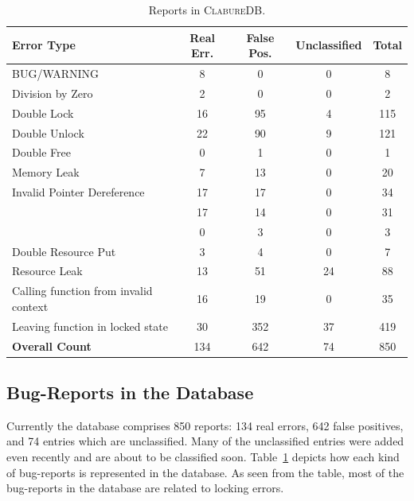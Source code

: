 \documentclass[10pt]{llncs}
\newcommand\cdb{\textsc{ClabureDB}\xspace}
\begin{document}
\begin{table}[tb]
\begin{center}
\small
\setlength{\tabcolsep}{2.5pt}
\begin{tabular}{|l|c|c|c|c|} \hline
\textbf{Error Type} & \textbf{Real Err.} & \textbf{False Pos.} &
	\textbf{Unclassified} & \textbf{Total} \\ \hline
BUG/WARNING & 8 & 0 & 0 & 8 \\
Division by Zero & 2 & 0 & 0 & 2 \\
Double Lock & 16 & 95 & 4 & 115 \\
Double Unlock & 22 & 90 & 9 & 121 \\
Double Free & 0 & 1 & 0 & 1 \\
Memory Leak & 7 & 13 & 0 & 20 \\
Invalid Pointer Dereference & 17 & 17 & 0 & 34 \\ 
\hspace{1em}\cellcolor{black!10}{\scriptsize NULL Pointer Dereference} & 
\cellcolor{black!10}\scriptsize 17 & \cellcolor{black!10}\scriptsize 14 & 
\cellcolor{black!10}\scriptsize 0 & \cellcolor{black!10}\scriptsize 31 \\
\hspace{1em}\cellcolor{black!10}{\scriptsize Use After Free} & 
\cellcolor{black!10}\scriptsize 0 & \cellcolor{black!10}\scriptsize 3 & 
\cellcolor{black!10}\scriptsize 0 & \cellcolor{black!10}\scriptsize 3 \\
Double Resource Put & 3 & 4 & 0 & 7 \\
Resource Leak & 13 & 51 & 24 & 88 \\
Calling function from invalid context & 16 & 19 & 0 & 35 \\
Leaving function in locked state & 30 & 352 & 37 & 419 \\ \hline
\textbf{Overall Count} & 134 & 642 & 74 & 850 \\ \hline
\end{tabular}
\end{center}
\caption{Reports in \cdb.}
\label{tab:reports}
\end{table}

\subsection{Bug-Reports in the Database}

Currently the database comprises 850 reports: 134 real errors, 642 false
positives, and 74 entries which are unclassified. Many of the unclassified
entries were added even recently and are about to be classified soon.
Table~\ref{tab:reports} depicts how each kind of bug-reports is represented in
the database. As seen from the table, most of the bug-reports in the database
are related to locking errors. 
\end{document}
